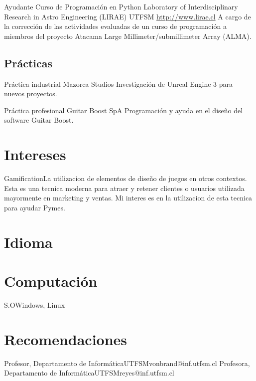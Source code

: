 \documentclass[a4paper,10pt]{moderncv}
\makeatletter
\renewcommand*{\bibliographyitemlabel}{\@biblabel{\arabic{enumiv}}}
\makeatother
\begin{document}
        {Ayudante Curso de Programación en Python}
        {Laboratory of Interdisciplinary Research in Astro Engineering (LIRAE)}
        {UTFSM}
        {\url{http://www.lirae.cl}}
        {A cargo de la corrección de las actividades evaluadas de un curso
        de programación a miembros del proyecto Atacama Large Millimeter/submillimeter
        Array (ALMA).}

\subsection{Prácticas}

        {Práctica industrial}
        {Mazorca Studios}
        {}
        {}
        {Investigación de Unreal Engine 3 para nuevos proyectos.}%

        {Práctica profesional}
        {Guitar Boost SpA}
        {}
        {}
        {Programación y ayuda en el diseño del software Guitar Boost.}%

\section{Intereses}
           {Gamification}{La utilizacion de elementos de diseño de juegos en otros 
	   contextos. Esta es una tecnica moderna para atraer y retener clientes 
           o usuarios utilizada mayormente en marketing y ventas. Mi interes es en
           la utilizacion de esta tecnica para ayudar Pymes.}

\section{Idioma}

\section{Computaci\'on}
 {S.O}{Windows, Linux}

\section{Recomendaciones}
        {Profesor, Departamento de Informática}{UTFSM}{vonbrand@inf.utfsm.cl}{}
        {Profesora, Departamento de Informática}{UTFSM}{reyes@inf.utfsm.cl}{}


\nocite{*}                                                                           
                                                            
\end{document}
